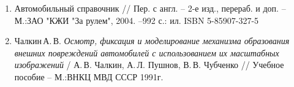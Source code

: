 \begin{enumerate}
%
%
%
%
%
%
%
%
\item
Автомобильный справочник //  Пер. с англ.  -- 2-е изд., перераб. и доп. --М.:ЗАО "КЖИ "За рулем", 2004. --992 с.: ил.  ISBN 5-85907-327-5
%
%
\item
Чалкин\,А.\,В.  \emph{Осмотр, фиксация и моделирование механизма образования внешних повреждений автомобилей с использованием их масштабных изображений} / А.\,В. Чалкин, А.\,Л. Пушнов, В.\,В. Чубченко // Учебное пособие -- М.:ВНКЦ МВД СССР 1991г.
%
%
%


\end{enumerate}
